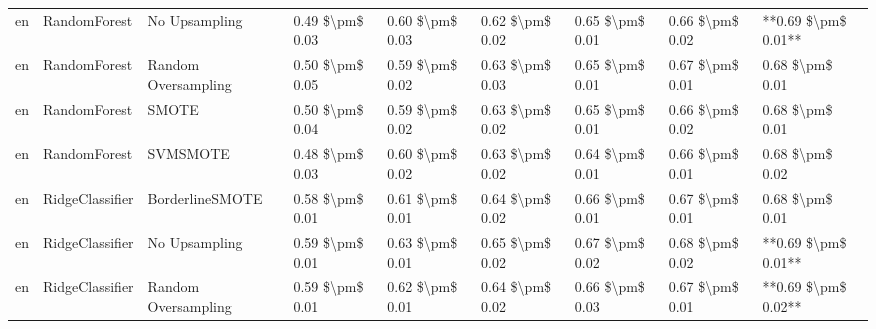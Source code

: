 \begin{tabular}{lllllllll}
      en &                    RandomForest &                 No Upsampling & 0.49 \$\textbackslash pm\$ 0.03 &           0.60 \$\textbackslash pm\$ 0.03 &       0.62 \$\textbackslash pm\$ 0.02 &        0.65 \$\textbackslash pm\$ 0.01 &                         0.66 \$\textbackslash pm\$ 0.02 & **0.69 \$\textbackslash pm\$ 0.01** \\
      en &                    RandomForest &           Random Oversampling & 0.50 \$\textbackslash pm\$ 0.05 &           0.59 \$\textbackslash pm\$ 0.02 &       0.63 \$\textbackslash pm\$ 0.03 &        0.65 \$\textbackslash pm\$ 0.01 &                         0.67 \$\textbackslash pm\$ 0.01 &     0.68 \$\textbackslash pm\$ 0.01 \\
      en &                    RandomForest &                         SMOTE & 0.50 \$\textbackslash pm\$ 0.04 &           0.59 \$\textbackslash pm\$ 0.02 &       0.63 \$\textbackslash pm\$ 0.02 &        0.65 \$\textbackslash pm\$ 0.01 &                         0.66 \$\textbackslash pm\$ 0.02 &     0.68 \$\textbackslash pm\$ 0.01 \\
      en &                    RandomForest &                      SVMSMOTE & 0.48 \$\textbackslash pm\$ 0.03 &           0.60 \$\textbackslash pm\$ 0.02 &       0.63 \$\textbackslash pm\$ 0.02 &        0.64 \$\textbackslash pm\$ 0.01 &                         0.66 \$\textbackslash pm\$ 0.01 &     0.68 \$\textbackslash pm\$ 0.02 \\
      en &                 RidgeClassifier &               BorderlineSMOTE & 0.58 \$\textbackslash pm\$ 0.01 &           0.61 \$\textbackslash pm\$ 0.01 &       0.64 \$\textbackslash pm\$ 0.02 &        0.66 \$\textbackslash pm\$ 0.01 &                         0.67 \$\textbackslash pm\$ 0.01 &     0.68 \$\textbackslash pm\$ 0.01 \\
      en &                 RidgeClassifier &                 No Upsampling & 0.59 \$\textbackslash pm\$ 0.01 &           0.63 \$\textbackslash pm\$ 0.01 &       0.65 \$\textbackslash pm\$ 0.02 &        0.67 \$\textbackslash pm\$ 0.02 &                         0.68 \$\textbackslash pm\$ 0.02 & **0.69 \$\textbackslash pm\$ 0.01** \\
      en &                 RidgeClassifier &           Random Oversampling & 0.59 \$\textbackslash pm\$ 0.01 &           0.62 \$\textbackslash pm\$ 0.01 &       0.64 \$\textbackslash pm\$ 0.02 &        0.66 \$\textbackslash pm\$ 0.03 &                         0.67 \$\textbackslash pm\$ 0.01 & **0.69 \$\textbackslash pm\$ 0.02** \\

\end{tabular}
